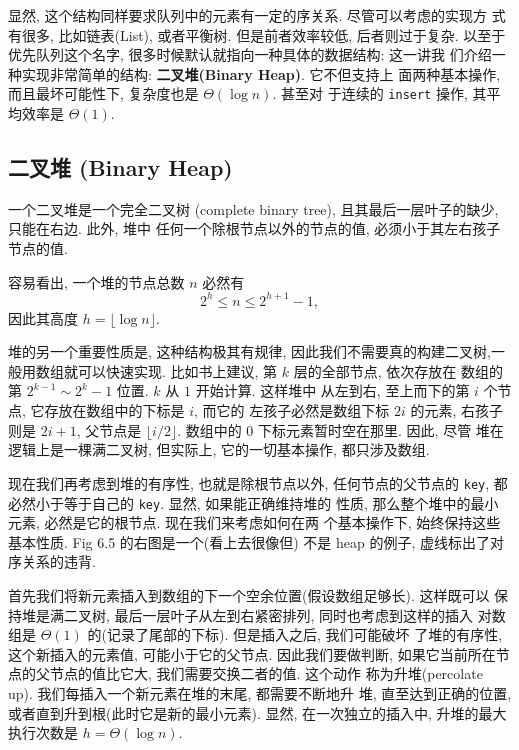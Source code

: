 \documentclass[a4paper]{ctexart}
\theoremstyle{definition}
\theoremstyle{definition}
\begin{document}
显然, 这个结构同样要求队列中的元素有一定的序关系. 尽管可以考虑的实现方
式有很多, 比如链表(List), 或者平衡树. 但是前者效率较低, 后者则过于复杂.
以至于优先队列这个名字, 很多时候默认就指向一种具体的数据结构: 这一讲我
们介绍一种实现非常简单的结构: {\bf 二叉堆(Binary Heap)}.  它不但支持上
面两种基本操作, 而且最坏可能性下, 复杂度也是 $\Theta(\log n)$. 甚至对
于连续的 \verb|insert| 操作, 其平均效率是 $\Theta(1)$.

\subsection{二叉堆 (Binary Heap)}

 一个二叉堆是一个完全二叉树
(complete binary tree), 且其最后一层叶子的缺少, 只能在右边. 此外, 堆中
任何一个除根节点以外的节点的值, 必须小于其左右孩子节点的值.

容易看出, 一个堆的节点总数 $n$ 必然有
$$
2^h \leq n \leq 2^{h + 1} - 1,
$$
因此其高度 $h = \lfloor \log n \rfloor$.

堆的另一个重要性质是, 这种结构极其有规律, 因此我们不需要真的构建二叉树,一
般用数组就可以快速实现. 比如书上建议, 第 $k$ 层的全部节点, 依次存放在
数组的第 $2^{k-1} \sim 2^{k} - 1$ 位置. $k$ 从 $1$ 开始计算. 这样堆中
从左到右, 至上而下的第 $i$ 个节点, 它存放在数组中的下标是 $i$, 而它的
左孩子必然是数组下标 $2i$ 的元素, 右孩子则是 $2i + 1$, 父节点是
$\lfloor i / 2\rfloor$. 数组中的 $0$ 下标元素暂时空在那里. 因此, 尽管
堆在逻辑上是一棵满二叉树, 但实际上, 它的一切基本操作, 都只涉及数组.

现在我们再考虑到堆的有序性, 也就是除根节点以外, 任何节点的父节点的
\verb|key|, 都必然小于等于自己的 \verb|key|. 显然, 如果能正确维持堆的
性质, 那么整个堆中的最小元素, 必然是它的根节点. 现在我们来考虑如何在两
个基本操作下, 始终保持这些基本性质. Fig 6.5 的右图是一个(看上去很像但)
不是 heap 的例子, 虚线标出了对序关系的违背.


首先我们将新元素插入到数组的下一个空余位置(假设数组足够长). 这样既可以
保持堆是满二叉树, 最后一层叶子从左到右紧密排列, 同时也考虑到这样的插入
对数组是 $\Theta(1)$ 的(记录了尾部的下标). 但是插入之后, 我们可能破坏
了堆的有序性, 这个新插入的元素值, 可能小于它的父节点. 因此我们要做判断,
如果它当前所在节点的父节点的值比它大, 我们需要交换二者的值.  这个动作
称为升堆(percolate up). 我们每插入一个新元素在堆的末尾, 都需要不断地升
堆, 直至达到正确的位置, 或者直到升到根(此时它是新的最小元素).  显然,
在一次独立的插入中, 升堆的最大执行次数是 $h = \Theta(\log n)$.
\end{document}
